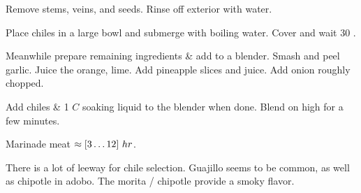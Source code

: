 \begin{preparation}
\item Remove stems, veins, and seeds.
	Rinse off exterior with water.

\item Place chiles in a large bowl and submerge with boiling water.
	Cover and wait 30 \minute.

\item Meanwhile prepare remaining ingredients \& add to a blender.
	Smash and peel garlic.
	Juice the orange, lime.
	Add pineapple slices and juice.
	Add onion roughly chopped.

\item Add chiles \& 1 $C$ soaking liquid to the blender when done.
	Blend on high for a few minutes.

\item Marinade meat $\approx[3\ldots12]~\hour$.
\end{preparation}


\begin{variation}
\item There is a lot of leeway for chile selection.
	Guajillo seems to be common, as well as chipotle in adobo.
	The morita / chipotle provide a smoky flavor.
\end{variation}


\recipeend%
